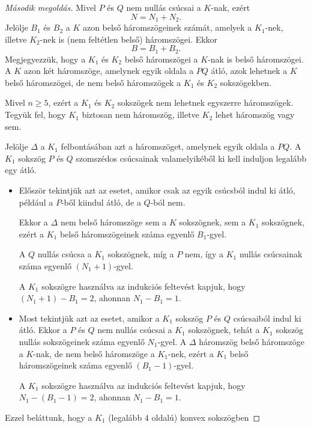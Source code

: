 \begin{proof}[Második megoldás]
Mivel $P$ és $Q$ nem nullás csúcsai a $K$-nak, ezért 
\begin{equation}
N=N_{1}+N_{2}.\label{felixx-1}
\end{equation}
Jelölje $B_{1}$ és $B_{2}$ a $K$ azon belső háromszögeinek számát,
amelyek a $K_{1}$-nek, illetve $K_{2}$-nek is (nem feltétlen belső)
háromszögei. Ekkor 
\begin{equation}
B=B_{1}+B_{2}.\label{felixx-2}
\end{equation}
Megjegyezzük, hogy a $K_{1}$ és $K_{2}$ belső háromszögei a $K$-nak
is belső háromszögei. A $K$ azon két háromszöge, amelynek egyik oldala
a $PQ$ átló, azok lehetnek a $K$ belső háromszögei, de nem belső
háromszögek a $K_{1}$ és $K_{2}$ sokszögekben.\par Mivel $n\geq5$,
ezért a $K_{1}$ és $K_{2}$ sokszögek nem lehetnek egyszerre háromszögek.
Tegyük fel, hogy $K_{1}$ biztosan nem háromszög, illetve $K_{2}$
lehet háromszög vagy sem.\par Jelölje $\Delta$ a $K_{1}$ felbontásában
azt a háromszöget, amelynek egyik oldala a $PQ$. A $K_{1}$ sokszög
$P$ és $Q$ szomszédos csúcsainak valamelyikéből ki kell induljon
legalább egy átló. 
\begin{itemize}
\item Először tekintjük azt az esetet, amikor csak az egyik csúcsból indul
ki átló, például a $P$-ből kiindul átló, de a $Q$-ból nem.\par Ekkor
a $\Delta$ nem belső háromszöge sem a $K$ sokszögnek, sem a $K_{1}$
sokszögnek, ezért a $K_{1}$ belső háromszögeinek száma egyenlő $B_{1}$-gyel.\par A
$Q$ nullás csúcsa a $K_{1}$ sokszögnek, míg a $P$ nem, így a $K_{1}$
nullás csúcsainak száma egyenlő $(N_{1}+1)$-gyel.\par A $K_{1}$
sokszögre használva az indukciós feltevést kapjuk, hogy $(N_{1}+1)-B_{1}=2$,
ahonnan $N_{1}-B_{1}=1$.
\item Most tekintjük azt az esetet, amikor a $K_{1}$ sokszög $P$ és $Q$
csúcsaiból indul ki átló. Ekkor a $P$ és $Q$ nem nullás csúcsai
a $K_{1}$ sokszögnek, tehát a $K_{1}$ sokszög nullás sokszögeinek
száma egyenlő $N_{1}$-gyel. A $\Delta$ háromszög belső háromszöge
a $K$-nak, de nem belső háromszöge a $K_{1}$-nek, ezért a $K_{1}$
belső háromszögeinek száma egyenlő $(B_{1}-1)$-gyel.\par A $K_{1}$
sokszögre használva az indukciós feltevést kapjuk, hogy $N_{1}-(B_{1}-1)=2$,
ahonnan $N_{1}-B_{1}=1$.
\end{itemize}
Ezzel beláttunk, hogy a $K_{1}$ (legalább $4$ oldalú) konvex sokszögben

\end{proof}
